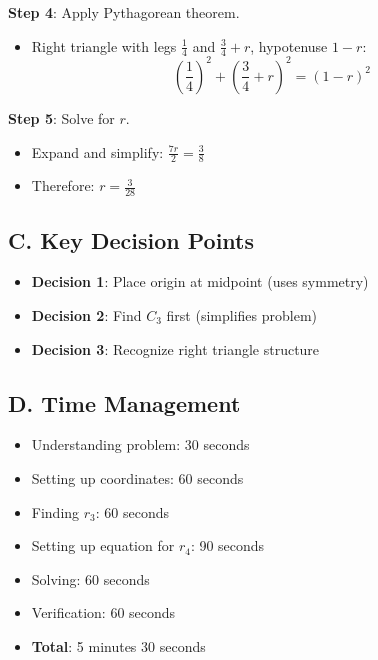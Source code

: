 \documentclass[11pt]{article}
\begin{document}
\begin{roadmapbox}
\textbf{Step 4}: Apply Pythagorean theorem.
\begin{itemize}
    \item Right triangle with legs $\frac{1}{4}$ and $\frac{3}{4} + r$, hypotenuse $1-r$:
    \[\left(\frac{1}{4}\right)^2 + \left(\frac{3}{4} + r\right)^2 = (1-r)^2\]
\end{itemize}

\textbf{Step 5}: Solve for $r$.
\begin{itemize}
    \item Expand and simplify: $\frac{7r}{2} = \frac{3}{8}$
    \item Therefore: $r = \frac{3}{28}$
\end{itemize}

\subsection*{C. Key Decision Points}
\begin{itemize}[leftmargin=*]
    \item \textbf{Decision 1}: Place origin at midpoint (uses symmetry)
    \item \textbf{Decision 2}: Find $C_3$ first (simplifies problem)
    \item \textbf{Decision 3}: Recognize right triangle structure
\end{itemize}

\subsection*{D. Time Management}
\begin{itemize}[leftmargin=*]
    \item Understanding problem: 30 seconds
    \item Setting up coordinates: 60 seconds
    \item Finding $r_3$: 60 seconds
    \item Setting up equation for $r_4$: 90 seconds
    \item Solving: 60 seconds
    \item Verification: 60 seconds
    \item \textbf{Total}: 5 minutes 30 seconds
\end{itemize}
\end{roadmapbox}
\end{document}
